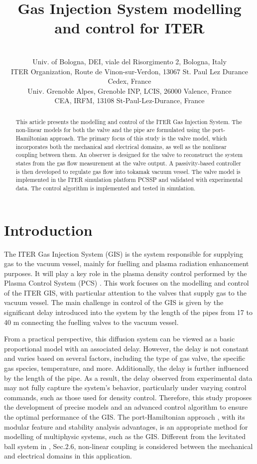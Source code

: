 \documentclass[letterpaper, 10pt, conference]{ieeeconf}
\date{}
\title{Gas Injection System modelling and control for ITER}
\author{\authorblockN{Dante Piotto\authorrefmark{1},
                        Anna Trang Vu\authorrefmark{2},
                        Luca Zabeo\authorrefmark{2}, 
                        Laurent Lef\`evre\authorrefmark{3}, 
                        Alessandro Macchelli\authorrefmark{1}, \\
                        Thomas Keenan\authorrefmark{2}, 
                        Remy Nouailletas\authorrefmark{4},
                        Timo Ravensbergen\authorrefmark{2},                          
                        Peter De Vries\authorrefmark{2},                        
                        David Weldon\authorrefmark{4}}\\
	\authorrefmark{1} Univ.  of Bologna, DEI, viale del Risorgimento 2, Bologna, Italy\\ %
	\authorrefmark{2} ITER Organization, Route de Vinon-sur-Verdon, 13067 St. Paul Lez Durance Cedex, France \\%
	\authorrefmark{3} Univ. Grenoble Alpes, Grenoble INP, LCIS, 26000 Valence, France \\ %
    \authorrefmark{4} CEA, IRFM, 13108 St-Paul-Lez-Durance, France %
    }
\begin{document}
\maketitle
\thispagestyle{empty}
\pagestyle{empty}

\begin{abstract}

This article presents the modelling and control of the ITER Gas Injection System. The non-linear models for both the valve and the pipe are formulated using the port-Hamiltonian approach. The primary focus of this study is the valve model, which incorporates both the mechanical and electrical domains, as well as the nonlinear coupling between them. An observer is designed for the valve to reconstruct the system states from the gas flow measurement at the valve output. A passivity-based controller is then developed to regulate gas flow into tokamak vacuum vessel. The valve model is implemented in the ITER simulation platform PCSSP and validated with experimental data. The control algorithm is implemented and tested in simulation.

\end{abstract}
\section{Introduction}
The ITER Gas Injection System (GIS)\cite{GIS_2012} is the system responsible for supplying gas to the vacuum vessel, mainly for fuelling and plasma radiation enhancement purposes. It will play a key role in the plasma density control performed by the Plasma Control System (PCS) \cite{deVries2024}. This work focuses on the modelling and control of the ITER GIS, with particular attention to the valves that supply gas to the vacuum vessel. The main challenge in control of the GIS is given by the significant delay introduced into the system by the length of the pipes from 17 to 40 m connecting the fuelling valves to the vacuum vessel.

From a practical perspective, this diffusion system can be viewed as a basic proportional model with an associated delay. However, the delay is not constant and varies based on several factors, including the type of gas valve, the specific gas species, temperature, and more. Additionally, the delay is further influenced by the length of the pipe. As a result, the delay observed from experimental data may not fully capture the system’s behavior, particularly under varying control commands, such as those used for density control. Therefore, this study proposes the development of precise models and an advanced control algorithm to ensure the optimal performance of the GIS.
The port-Hamiltonian approach \cite{maschke1993port,schaft2020}, with its modular feature and stability analysis advantages, is an appropriate method for modelling of multiphysic systems, such as the GIS. Different from the levitated ball system in \cite{schaft2020}, Sec.2.6, non-linear coupling is considered between the mechanical and electrical domains in this application.
\end{document}
